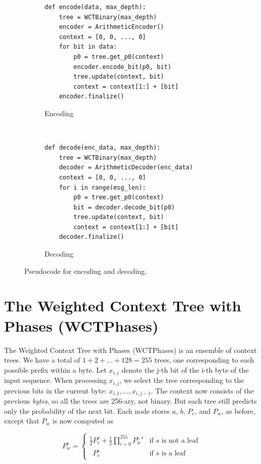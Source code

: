 \documentclass[11pt]{scrartcl}
\begin{document}
\begin{figure}[h!]
    \vspace{1cm}  %
    \centering
    \begin{subfigure}[b]{0.5\textwidth}
\begin{verbatim}
def encode(data, max_depth):
    tree = WCTBinary(max_depth)
    encoder = ArithmeticEncoder()
    context = [0, 0, ..., 0]
    for bit in data:
        p0 = tree.get_p0(context)
        encoder.encode_bit(p0, bit)
        tree.update(context, bit)
        context = context[1:] + [bit]
    encoder.finalize() \end{verbatim}
        \caption{Encoding}
    \end{subfigure}
    ~
    \begin{subfigure}[b]{0.45\textwidth}
\begin{verbatim}
def decode(enc_data, max_depth):
    tree = WCTBinary(max_depth)
    decoder = ArithmeticDecoder(enc_data)
    context = [0, 0, ..., 0]
    for i in range(msg_len):
        p0 = tree.get_p0(context)
        bit = decoder.decode_bit(p0)
        tree.update(context, bit)
        context = context[1:] + [bit]
    decoder.finalize() \end{verbatim}
        \caption{Decoding}
    \end{subfigure}
    \caption{Pseudocode for encoding and decoding.}
    \label{fig:enc-dec}
\end{figure}


\section{The Weighted Context Tree with Phases (WCTPhases)}
\label{sec:wct-phases}

The Weighted Context Tree with Phases (WCTPhases) is an ensemble of context
trees. We have a total of $1 + 2 + ... + 128 = 255$ trees, one corresponding to
each possible prefix within a byte. Let $x_{i,j}$ denote the j-th bit of the
i-th byte of the input sequence.  When processing $x_{i,j}$, we select the tree
corresponding to the previous bits in the current byte: $x_{i,1}, ...,
x_{i,j-1}$. The context now consists of the previous {\em bytes}, so all the
trees are 256-ary, not binary. But each tree still predicts only the
probability of the next bit. Each node stores $a$, $b$, $P_e$, and $P_w$, as
before, except that $P_w$ is now computed as

\[
P_w^s =
\left\{
\begin{array}{ll}
\frac{1}{2} P_e^s + \frac{1}{2} \prod_{i=0}^{255}{ P_w^{i,s} }
    & \mbox{if $s$ is not a leaf} \\
\phantom{\frac{1}{2}} P_e^s
    & \mbox{if $s$ is a leaf}
\end{array}
\right.
\]
\end{document}
